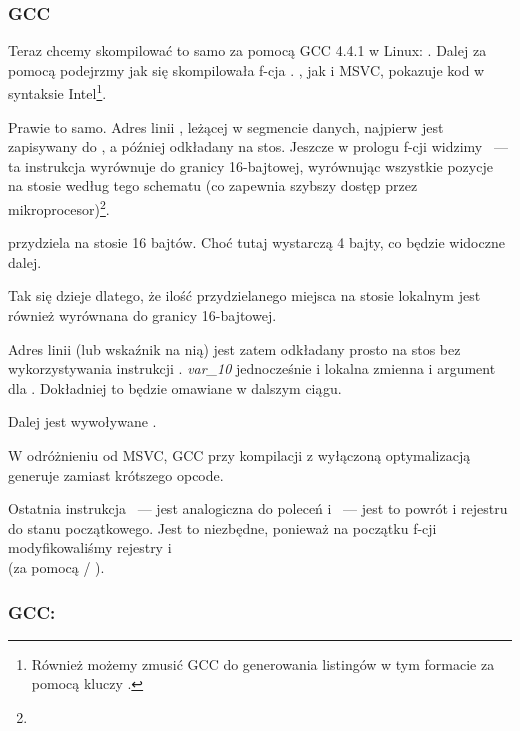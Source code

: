\subsubsection{GCC}

Teraz chcemy skompilować to samo za pomocą GCC 4.4.1 w Linux: .
Dalej za pomocą \IDA podejrzmy jak się skompilowała f-cja \main.
\IDA, jak i MSVC, pokazuje kod w syntaksie Intel\footnote{Również możemy zmusić GCC do generowania listingów w tym formacie za pomocą kluczy .}.



Prawie to samo. 
Adres linii , leżącej w segmencie danych, najpierw jest zapisywany do \EAX, a później odkładany na stos.
Jeszcze w prologu f-cji widzimy ~--- 
ta instrukcja wyrównuje \ESP do granicy 16-bajtowej, wyrównując wszystkie pozycje 
na stosie według tego schematu (co zapewnia szybszy dostęp przez mikroprocesor)\footnote{\URLWPDA}.

 przydziela na stosie 16 bajtów. Choć tutaj wystarczą 4 bajty, co będzie widoczne dalej.

Tak się dzieje dlatego, że ilość przydzielanego miejsca na stosie lokalnym jest również wyrównana do granicy 16-bajtowej.

Adres linii (lub wskaźnik na nią) jest zatem odkładany prosto na stos bez wykorzystywania instrukcji \PUSH.
\emph{var\_10} jednocześnie i lokalna zmienna i argument dla \printf{}. Dokładniej to będzie omawiane w dalszym ciągu.

Dalej jest wywoływane \printf.

W odróżnieniu od MSVC, GCC przy kompilacji z wyłączoną optymalizacją generuje  zamiast krótszego opcode.

Ostatnia instrukcja \LEAVE~--- jest analogiczna do poleceń  i ~--- jest to powrót  i rejestru \EBP do stanu początkowego.
Jest to niezbędne, ponieważ na początku f-cji modyfikowaliśmy rejestry \ESP i \EBP{}\\
(za pomocą  / ).

\subsubsection{GCC: \ATTSyntax}
\label{ATT_syntax}


